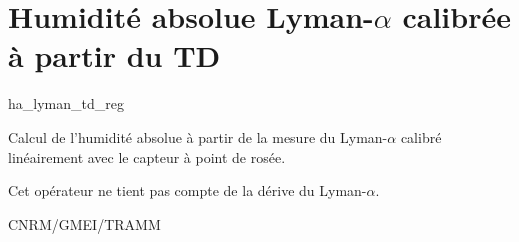 %
\section{Humidit\'e absolue Lyman-$\alpha$ calibr\'ee
\`a partir du TD}

 {\sf ha\_lyman\_td\_reg}

Calcul de l'humidit\'e absolue \`a partir de la mesure du
Lyman-$\alpha$ calibr\'e lin\'eairement avec le capteur
\`a point de ros\'ee.

\bigskip







Cet op\'erateur ne tient pas compte de la d\'erive du
Lyman-$\alpha$.

CNRM/GMEI/TRAMM

